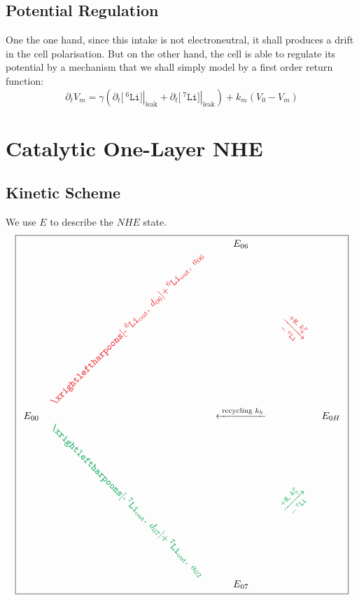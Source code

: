 \documentclass[aps,onecolumn,11pt]{revtex4}
\newcommand{\mychem}[1]{\mathtt{#1}}
\newcommand{\myconc}[1]{\big[#1\big]}
\newcommand{\spLi}[1]{{\!~^{#1}\mychem{Li}}}
\newcommand{\Li}[1]{\myconc{\spLi{#1}}}
\newcommand{\spproton}{\mychem{H}}
\newcommand{\myleak}[1]{\left.{#1}\right\vert_{\mathrm{leak}}}
\newcommand{\myout}[1]{{#1}_{\mathrm{out}}}
\newcommand{\spLiOut}[1]{\myout{\spLi{#1}}}
\newcommand{\myrotate}[2]{\rotatebox[origin=c]{#1}{#2}}
\newcommand{\outLi}[1]{\text{-}\spLiOut{#1}}
\newcommand{\mycolor}[2]{\ifthenelse{\equal{#1}{6}}{{\color{Red}#2}}{{\color{Green}#2}}}
\begin{document}
\subsection{Potential Regulation}
One the one hand, since this intake is not electroneutral, it shall produces a drift in the cell polarisation. But on the other hand, the cell is able to regulate its potential 
by a mechanism that we shall simply model by a first order return function:
\begin{equation}
	\partial_t V_m = \gamma \left( \partial_t \myleak{\Li{6}} + \partial_t \myleak{\Li{7}} \right) + k_m \left(V_0-V_m\right)
\end{equation}

\section{Catalytic One-Layer NHE}

\subsection{Kinetic Scheme}
We use $E$ to describe the $NHE$ state.
{
\Large
\begin{equation}
\boxed{
\begin{array}{ccccc}
 & & E_{06}  &  & \\
 &  \mycolor{6}{\myrotate{45}{$\xrightleftharpoons[\outLi{6},\;d_{06}]{+\spLiOut{6},\;a_{06}}$}} &   & \mycolor{6}{\myrotate{-45}{$\xrightarrow[-\spLi{6}]{+ \spproton, \; k^p_6}$}} &  \\
E_{00}  &  & \xleftarrow{\text{ recycling } k_h } &   & E_{0H} \\
  & \mycolor{7}{\myrotate{-45}{$\xrightleftharpoons[\outLi{7},\;d_{07}]{+\spLiOut{7},\;a_{02}}$}} &   & \mycolor{7}{\myrotate{+45}{$\xrightarrow[-\spLi{7}]{+ \spproton, \; k^p_7}$}} & \\
 & & E_{07} & & \\
 \end{array}
 }
\end{equation}
}
\end{document}
